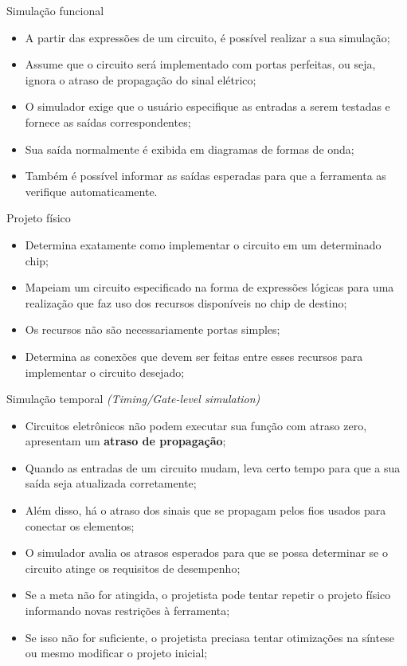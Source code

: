 \begin{frame}{Simulação funcional}
    \begin{itemize}
        \item A partir das expressões de um circuito, é possível realizar a sua simulação; 
        \item Assume que o circuito será implementado com portas perfeitas, ou seja, ignora o atraso de propagação do sinal elétrico;
        \item O simulador exige que o usuário especifique as entradas a serem testadas e fornece as saídas correspondentes; 
        \item Sua saída normalmente é exibida em diagramas de formas de onda;
        \item Também é possível informar as saídas esperadas para que a ferramenta as verifique automaticamente. 
    \end{itemize}    
\end{frame}

\begin{frame}{Projeto físico}
    \begin{itemize}
        \item Determina exatamente como implementar o circuito em um determinado chip;
        \item Mapeiam um circuito especificado na forma de expressões lógicas para uma realização que faz uso dos recursos disponíveis no chip de destino;
        \item Os recursos não são necessariamente portas simples; 
        \item Determina as conexões que devem ser feitas entre esses recursos para implementar o circuito desejado;
    \end{itemize}
\end{frame}

\begin{frame}{Simulação temporal \textit{(Timing/Gate-level simulation)}}
    \begin{itemize}
        \item Circuitos eletrônicos não podem executar sua função com atraso zero, apresentam um \textbf{atraso de propagação};
        \item Quando as entradas de um circuito mudam, leva certo tempo para que a sua saída seja atualizada corretamente; 
        \item Além disso, há o atraso dos sinais que se propagam pelos fios usados para conectar os elementos; 
        \item O simulador avalia os atrasos esperados para que se possa determinar se o circuito atinge os requisitos de desempenho; 
        \item Se a meta não for atingida, o projetista pode tentar repetir o projeto físico informando novas restrições à ferramenta;
        \item Se isso não for suficiente, o projetista preciasa tentar otimizações na síntese ou mesmo modificar o projeto inicial;
    \end{itemize}    
\end{frame}

